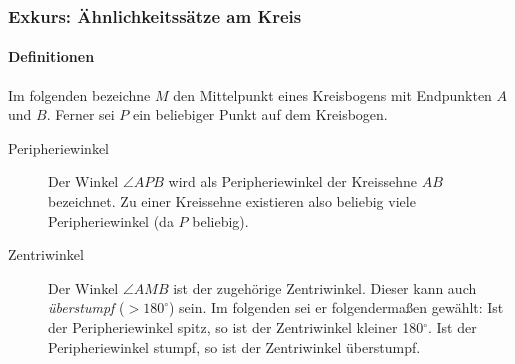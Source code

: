 \documentclass[11pt]{article}
\begin{document}
\subsubsection*{Exkurs: Ähnlichkeitssätze am Kreis}
\paragraph{Definitionen} Im folgenden bezeichne $ M $ den Mittelpunkt eines Kreisbogens mit Endpunkten $ A $ und $ B $. Ferner sei $ P $ ein beliebiger Punkt auf dem Kreisbogen.
\begin{description}
	\item[Peripheriewinkel] Der Winkel $ \angle APB $ wird als Peripheriewinkel der Kreissehne $ AB $ bezeichnet. Zu einer Kreissehne existieren also beliebig viele Peripheriewinkel (da $ P $ beliebig).
	\item[Zentriwinkel] Der Winkel $ \angle AMB $ ist der zugehörige Zentriwinkel. Dieser kann auch \textit{überstumpf} ($ > 180^\circ $) sein. Im folgenden sei er folgendermaßen gewählt: Ist der Peripheriewinkel spitz, so ist der Zentriwinkel kleiner 180$ ^\circ $. Ist der Peripheriewinkel stumpf, so ist der Zentriwinkel überstumpf.
\end{description}
\end{document}

